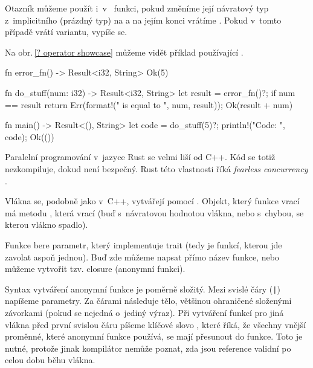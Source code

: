 \documentclass[main.tex]{subfiles}
\begin{document}
Otazník můžeme použít i~v~ funkci, pokud změníme její návratový typ
z~implicitního \irust{()} (prázdný typ) na  a na jejím konci vrátíme
. Pokud v~tomto případě  vrátí  variantu, vypíše se.

Na obr.\,\ref{? operator showcase} můžeme vidět příklad používající .

\obrazek
\begin{rustcode}
fn error_fn() -> Result<i32, String> {
    Ok(5)
}

fn do_stuff(num: i32) -> Result<i32, String> {
    let result = error_fn()?;
    if num == result {
        return Err(format!("{} is equal to {}", num, result));
    }
    Ok(result + num)
}

fn main() -> Result<(), String> {
    let code = do_stuff(5)?;
    println!("Code: {}", code);
    Ok(())
}
\end{rustcode}
\newline
{}


Paralelní programování v~jazyce Rust se velmi liší od C++. Kód se totiž nezkompiluje,
dokud není bezpečný. Rust této vlastnosti říká \emph{fearless concurrency}
\cite[kapitola\,16]{thebook}.


Vlákna se, podobně jako v~C++, vytvářejí pomocí . Objekt, který
funkce vrací má metodu , která vrací  (buď s~návratovou
hodnotou vlákna, nebo s~chybou, se kterou vlákno spadlo).

Funkce  bere  parametr, který implementuje trait 
(tedy je funkcí, kterou jde zavolat aspoň jednou). Buď zde můžeme napsat přímo název
funkce, nebo můžeme vytvořit tzv. closure (anonymní funkci).

Syntax vytváření anonymní funkce je poměrně složitý. Mezi svislé čáry (\texttt{|})
napíšeme parametry. Za čárami následuje tělo, většinou ohraničené složenými závorkami
(pokud se nejedná o~jediný výraz). Při vytváření funkcí pro jiná vlákna před první
svislou čáru píšeme klíčové slovo , které říká, že všechny vnější proměnné,
které anonymní funkce používá, se mají přesunout do funkce. Toto je nutné, protože jinak
kompilátor nemůže poznat, zda jsou reference validní po celou dobu běhu vlákna.
\cite[sekce\,13.1]{thebook}
\end{document}
